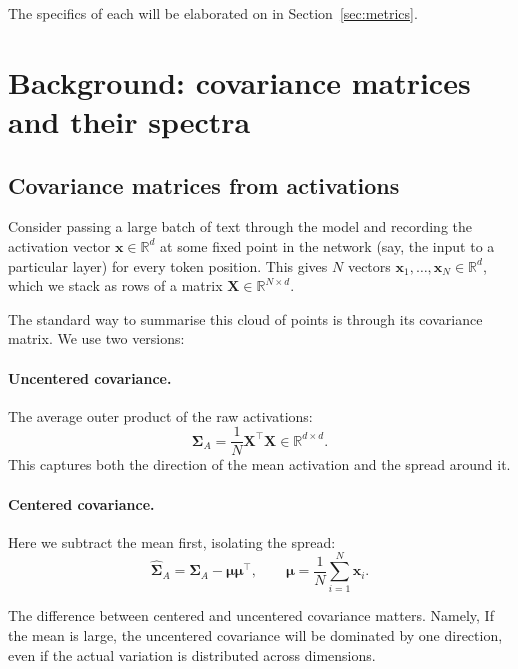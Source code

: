 \documentclass[11pt,a4paper]{article}
\newcommand{\R}{\mathbb{R}}
\begin{document}
The specifics of each will be elaborated on in Section~\ref{sec:metrics}.

\section{Background: covariance matrices and their spectra}

\subsection{Covariance matrices from activations}

Consider passing a large batch of text through the model and recording the activation vector $\mathbf{x} \in \R^d$ at some fixed point in the network (say, the input to a particular layer) for every token position.
This gives $N$ vectors $\mathbf{x}_1, \dots, \mathbf{x}_N \in \R^d$, which we stack as rows of a matrix $\mathbf{X} \in \R^{N \times d}$.

The standard way to summarise this cloud of points is through its covariance matrix.
We use two versions:

\paragraph{Uncentered covariance.} The average outer product of the raw activations:
\begin{equation}
  \bm{\Sigma}_A = \frac{1}{N}\mathbf{X}^\top \mathbf{X} \in \R^{d\times d}.
\end{equation}
This captures both the direction of the mean activation and the spread around it.

\paragraph{Centered covariance.} Here we subtract the mean first, isolating the spread:
\begin{equation}
  \hat{\bm{\Sigma}}_A = \bm{\Sigma}_A - \bm{\mu}\bm{\mu}^\top, \qquad \bm{\mu} = \frac{1}{N}\sum_{i=1}^N \mathbf{x}_i.
\end{equation}

The difference between centered and uncentered covariance matters. Namely, If the mean is large, the uncentered covariance will be dominated by one direction, even if the actual variation is distributed across dimensions.
\end{document}

